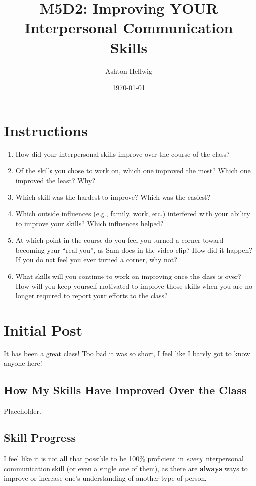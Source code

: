 \documentclass[stu,12pt]{apa7}
\title{%
    M5D2: Improving YOUR Interpersonal Communication Skills
  }
\author{Ashton Hellwig}
\date{\today}
\begin{document}
  \maketitle


  \section*{Instructions}
    \begin{enumerate}
      \item How did your interpersonal skills improve over the course of the
        class?
      \item Of the skills you chose to work on, which one improved the most?
        Which one improved the least? Why?
      \item Which skill was the hardest to improve? Which was the easiest?
      \item Which outside influences (e.g., family, work, etc.) interfered with
        your ability to improve your skills? Which influences helped?
      \item At which point in the course do you feel you turned a corner toward
        becoming your ``real you'', as Sam does in the video clip? How did it
        happen? If you do not feel you ever turned a corner, why not?
      \item What skills will you continue to work on improving once the class
        is over? How will you keep yourself motivated to improve those skills
        when you are no longer required to report your efforts to the class?
    \end{enumerate}


  \newpage
  \section{Initial Post}
    It has been a great class! Too bad it was so short, I feel like I barely
      got to know anyone here!

    \subsection{How My Skills Have Improved Over the Class}
      Placeholder.


    \subsection{Skill Progress}
      I feel like it is not all that possible to be 100\% proficient in
        \textit{every} interpersonal communication skill (or even a single
        one of them), as there are \textbf{always} ways to improve or increase
        one's understanding of another type of person.
\end{document}

